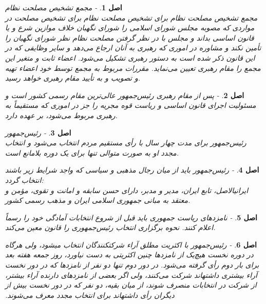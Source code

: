 \documentclass[12pt]{article}
\newtheorem{asl}{اصل}
\begin{document}
\begin{asl}- 
مجمع تشخیص مصلحت نظام 
\\
مجمع تشخیص مصلحت نظام برای تشخیص مصلحت نظام برای تشخیص مصلحت در مواردی که مصوبه مجلس شورای اسلامی را شورای نگهبان خلاف موازین شرع و یا قانون اساسی بداند و مجلس با در نظر گرفتن مصلحت نظام نظر شورای نگهبان را تأمین نکند و مشاوره در اموری که رهبری به آنان ارجاع می‌دهد و سایر وظایفی که در این قانون ذکر شده است به دستور رهبری تشکیل می‌شود. اعضاء ثابت و متغیر این مجمع را مقام رهبری تعیین می‌نماید. مقررات مربوط به مجمع توسط خود اعضاء تهیه و تصویب و به تأیید مقام رهبری خواهد رسید. 
 
\end{asl}

\begin{asl}- 
پس از مقام رهبری رئیس‌جمهور عالی‌ترین مقام رسمی کشور است و مسئولیت اجرای قانون اساسی و ریاست قوه مجریه را جز در اموری که مستقیماً به رهبری مربوط می‌شود، بر عهده دارد. 
\end{asl}

\begin{asl}- 
 رئیس‌جمهور 
 \\
رئیس‌جمهور برای مدت چهار سال با رأی مستقیم مردم انتخاب می‌شود و انتخاب مجدد او به صورت متوالی تنها برای یک دوره بلامانع است. 

\end{asl}

\begin{asl}- 
رئیس‌جمهور باید از میان رجال مذهبی و سیاسی که واجد شرایط زیر باشند انتخاب گردد: 
\\
ایرانی‏الاصل، تابع ایران، مدیر و مدبر، دارای حسن سابقه و امانت و تقوی، مؤمن و معتقد به مبانی جمهوری اسلامی ایران و مذهب رسمی کشور. 
 
\end{asl}

\begin{asl}- 
نامزدهای ریاست جمهوری باید قبل از شروع انتخابات آمادگی خود را رسماً اعلام کنند. نحوه برگزاری انتخاب رئیس‌جمهوری را قانون معین می‌کند.  
\end{asl}

\begin{asl}- 
رئیس‌جمهور با اکثریت مطلق آراء شرکت‏کنندگان انتخاب می‏شود، ولی هرگاه در دوره نخست هیچ‌یک از نامزدها چنین اکثریتی به دست نیاورد، روز جمعه هفته بعد برای بار دوم رأی گرفته می‌شود. در دور دوم تنها دو نفر از نامزدها که در دور نخست‏ آراء بیشتری داشته‏اند شرکت می‌کنند، ولی اگر بعضی از نامزدهای دارنده آراء بیشتر، از شرکت در انتخابات منصرف شوند، از میان بقیه، دو نفر که در دور نخست بیش از دیگران رأی داشته‏اند برای انتخاب مجدد معرف می‌شوند.‏
\end{asl}
\end{document}
